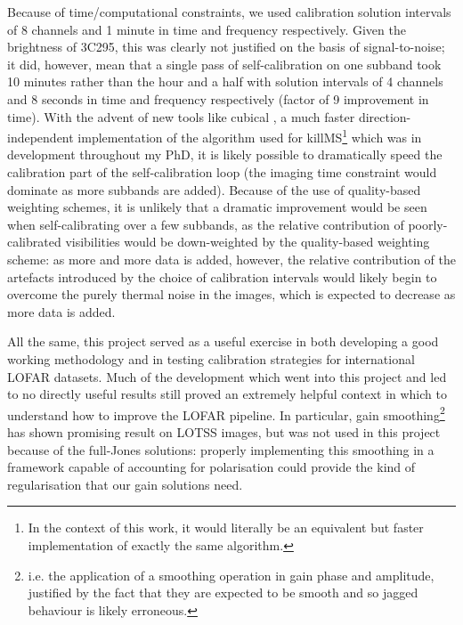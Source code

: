 \pg
Because of time/computational constraints, we used calibration solution intervals of 8 channels and 1 minute in time and frequency respectively. Given the brightness of 3C295, this was clearly not justified on the basis of signal-to-noise; it did, however, mean that a single pass of self-calibration on one subband took 10 minutes rather than the hour and a half with solution intervals of 4 channels and 8 seconds in time and frequency respectively (factor of 9 improvement in time). With the advent of new tools like cubical , a much faster direction-independent implementation of the algorithm used for killMS\footnote{In the context of this work, it would literally be an equivalent but faster implementation of exactly the same algorithm.} which was in development throughout my PhD, it is likely possible to dramatically speed the calibration part of the self-calibration loop (the imaging time constraint would dominate as more subbands are added). Because of the use of quality-based weighting schemes, it is unlikely that a dramatic improvement would be seen when self-calibrating over a few subbands, as the relative contribution of poorly-calibrated visibilities would be down-weighted by the quality-based weighting scheme: as more and more data is added, however, the relative contribution of the artefacts introduced by the choice of calibration intervals would likely begin to overcome the purely thermal noise in the images, which is expected to decrease as more data is added.%

\pg
All the same, this project served as a useful exercise in both developing a good working methodology and in testing calibration strategies for international LOFAR datasets. Much of the development which went into this project and led to no directly useful results still proved an extremely helpful context in which to understand how to improve the LOFAR pipeline. In particular, gain smoothing\footnote{i.e. the application of a smoothing operation in gain phase and amplitude, justified by the fact that they are expected to be smooth and so jagged behaviour is likely erroneous.} has shown promising result on LOTSS images, but was not used in this project because of the full-Jones solutions: properly implementing this smoothing in a framework capable of accounting for polarisation could provide the kind of regularisation that our gain solutions need.

